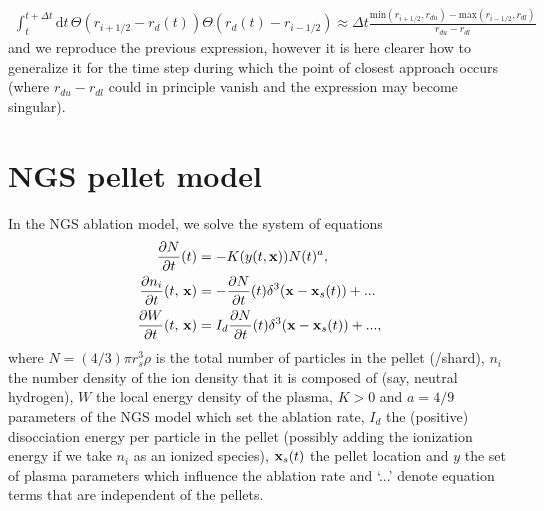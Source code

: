 \documentclass[11pt,a4paper]{article}
\newcommand{\rd}{\ensuremath{\mathrm{d}}}
\renewcommand{\b}[1]{\ensuremath{ {\bf #1 } }}
\begin{document}
\begin{align}
\int_t^{t+\Delta t}\rd t \, \Theta(r_{i+1/2} - r_d(t)) \Theta(r_d(t)-r_{i-1/2}) \approx \Delta t \frac{\text{min}(r_{i+1/2},r_{du})-\text{max}(r_{i-1/2},r_{dl})}{r_{du}-r_{dl}}
\end{align}
and we reproduce the previous expression, however it is here clearer how to generalize it for the time step during which the point of closest approach occurs (where $r_{du}-r_{dl}$ could in principle vanish and the expression may become singular).








\section*{NGS pellet model}
In the NGS ablation model, we solve the system of equations
\begin{align}
\frac{\partial N}{\partial t}(t) &= - K(y(t,\b{x})) N(t)^{a}, \\
\frac{\partial n_i}{\partial t}(t,\,\b{x}) &= - \frac{\partial N}{\partial t}(t)\delta^3(\b{x} - \b{x}_s(t)) + ...\\
\frac{\partial W}{\partial t}(t,\,\b{x}) &= I_d \frac{\partial N}{\partial t}(t) \delta^3(\b{x}-\b{x}_s(t)) + ...,
\end{align}
where $N =(4/3)\pi r_s^3 \rho$ is the total number of particles in the pellet (/shard), $n_i$ the number density of the ion density that it is composed of (say, neutral hydrogen), $W$ the local energy density of the plasma, $K>0$ and $a=4/9$ parameters of the NGS model which set the ablation rate, $I_d$ the (positive) disocciation energy per particle in the pellet (possibly adding the ionization energy if we take $n_i$ as an ionized species), $\b{x}_s(t)$ the pellet location and $y$ the set of plasma parameters which influence the ablation rate and `...' denote equation terms that are independent of the pellets.
\end{document}
